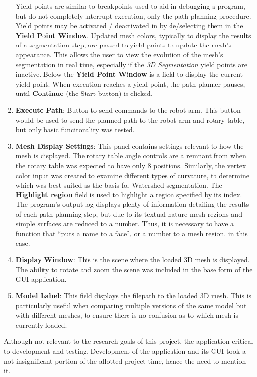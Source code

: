 \begin{enumerate}
		Yield points are similar to breakpoints used to aid in debugging a program, but do not completely interrupt execution, only the path planning procedure.
		Yield points may be activated / deactivated in by de/selecting them in the \textbf{Yield Point Window}.
		Updated mesh colors, typically to display the results of a segmentation step, are passed to yield points to update the mesh's appearance.
		This allows the user to view the evolution of the mesh's segmentation in real time, especially if the \textit{3D Segmentation} yield points are inactive.
		Below the \textbf{Yield Point Window} is a field to display the current yield point.
		When execution reaches a yield point, the path planner pauses, until \textbf{Continue} (the Start button) is clicked.
	\item \textbf{Execute Path}: Button to send commands to the robot arm.
		This button would be used to send the planned path to the robot arm and rotary table, but only basic funcitonality was tested.
	\item \textbf{Mesh Display Settings}: This panel contains settings relevant to how the mesh is displayed.
		The rotary table angle controls are a remnant from when the rotary table was expected to have only 8 positions.
		Similarly, the vertex color input was created to examine different types of curvature, to determine which was best suited as the basis for Watershed segmentation.
		The \textbf{Highlight region} field is used to highlight a region specified by its index.
		The program's output log displays plenty of information detailing the results of each path planning step, but due to its textual nature mesh regions and simple surfaces are reduced to a number.
		Thus, it is necessary to have a function that ``puts a name to a face'', or a number to a mesh region, in this case.
	\item \textbf{Display Window}: This is the scene where the loaded 3D mesh is displayed.
		The ability to rotate and zoom the scene was included in the base form of the GUI application.
	\item \textbf{Model Label}: This field displays the filepath to the loaded 3D mesh.
		This is particularly useful when comparing multiple versions of the same model but with different meshes, to ensure there is no confusion as to which mesh is currently loaded.
\end{enumerate}

Although not relevant to the research goals of this project, the application critical to development and testing.
Development of the application and its GUI took a not insignificant portion of the allotted project time, hence the need to mention it.

